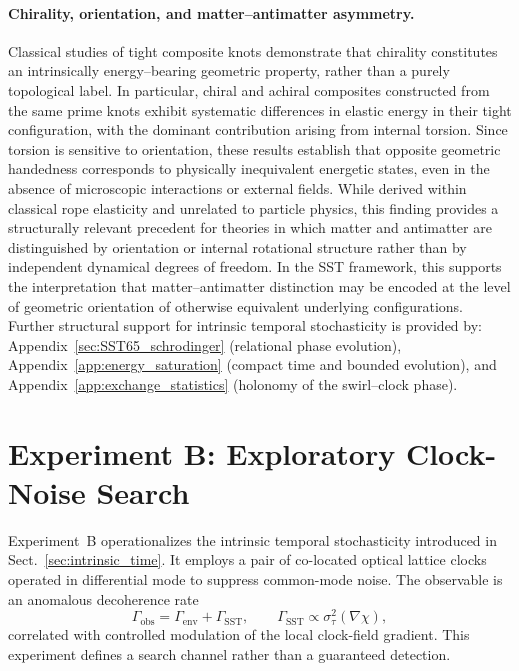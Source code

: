 \documentclass[11pt]{article}
\begin{document}
    \paragraph{Chirality, orientation, and matter--antimatter asymmetry.}
        Classical studies of tight composite knots demonstrate that chirality constitutes
        an intrinsically energy--bearing geometric property, rather than a purely
        topological label. In particular, chiral and achiral composites constructed from
        the same prime knots exhibit systematic differences in elastic energy in their
        tight configuration, with the dominant contribution arising from internal torsion.
        Since torsion is sensitive to orientation, these results establish that opposite
        geometric handedness corresponds to physically inequivalent energetic states,
        even in the absence of microscopic interactions or external fields. While derived
        within classical rope elasticity and unrelated to particle physics, this finding
        provides a structurally relevant precedent for theories in which matter and
        antimatter are distinguished by orientation or internal rotational structure
        rather than by independent dynamical degrees of freedom. In the SST framework,
        this supports the interpretation that matter--antimatter distinction may be
        encoded at the level of geometric orientation of otherwise equivalent underlying
        configurations.\cite{Faglioni2025TightKnots}
        Further structural support for intrinsic temporal stochasticity is provided by:
        Appendix~\ref{sec:SST65_schrodinger} (relational phase evolution),
        Appendix~\ref{app:energy_saturation} (compact time and bounded evolution),
        and Appendix~\ref{app:exchange_statistics} (holonomy of the swirl--clock phase).

    \section{Experiment B: Exploratory Clock-Noise Search}

        Experiment~B operationalizes the intrinsic temporal stochasticity
        introduced in Sect.~\ref{sec:intrinsic_time}.
        It employs a pair of co-located optical lattice clocks operated in
        differential mode to suppress common-mode noise.
        The observable is an anomalous decoherence rate
        \begin{equation}
            \Gamma_{\mathrm{obs}} = \Gamma_{\mathrm{env}} + \Gamma_{\mathrm{SST}},
            \qquad
            \Gamma_{\mathrm{SST}} \propto \sigma_\tau^2(\nabla \chi),
        \end{equation}
        correlated with controlled modulation of the local clock-field gradient.
        This experiment defines a search channel rather than a guaranteed detection.
\end{document}
